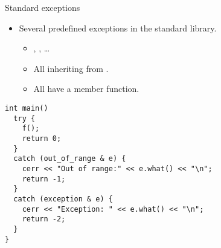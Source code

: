 \begin{frame}[t,fragile]{Standard exceptions}
\begin{itemize}
  \item Several predefined exceptions in the standard library.
    \begin{itemize}
      \item {}, , \ldots
      \item All inheriting from .
      \item All have a  member function.
    \end{itemize}
\end{itemize}
\begin{lstlisting}
int main()
  try {
    f();
    return 0;
  }
  catch (out_of_range & e) {
    cerr << "Out of range:" << e.what() << "\n";
    return -1;
  }
  catch (exception & e) {
    cerr << "Exception: " << e.what() << "\n";
    return -2;
  }
}
\end{lstlisting}
\end{frame}

